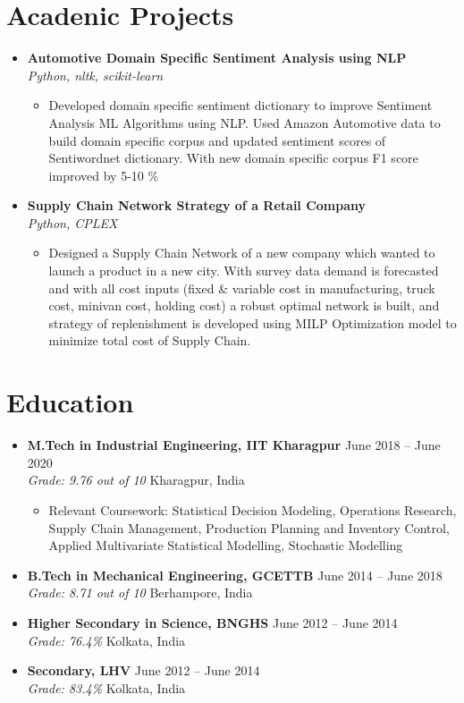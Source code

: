 \documentclass[a4paper,10pt]{article}
\newcommand{\resumeItem}[1]{\item\small{#1}}
\newcommand{\resumeSubheading}[4]{
  \vspace{1pt}\item
    \textbf{#1} \hfill {#2} \\
    \emph{#3} \hfill {#4} \\
}
\begin{document}
\section*{Acadenic Projects}
\begin{itemize}
    \resumeSubheading
      {Automotive Domain Specific Sentiment Analysis using NLP}{}
      {Python, nltk, scikit-learn}{}
      \begin{itemize}
        \resumeItem{
          Developed domain specific sentiment dictionary to improve Sentiment Analysis ML Algorithms using NLP. Used
          Amazon Automotive data to build domain specific corpus and updated sentiment scores of Sentiwordnet
          dictionary. With new domain specific corpus F1 score improved by 5-10 \%
        }
      \end{itemize}

    \resumeSubheading
      {Supply Chain Network Strategy of a Retail Company}{}
      {Python, CPLEX}{}
      \begin{itemize}
      \resumeItem{
        Designed a Supply Chain Network of a new company which wanted to launch a product in a new city. With
        survey data demand is forecasted and with all cost inputs (fixed \& variable cost in manufacturing, truck cost,
        minivan cost, holding cost) a robust optimal network is built, and strategy of replenishment is developed using
        MILP Optimization model to minimize total cost of Supply Chain.
      }
      \end{itemize}

\end{itemize}

\section*{Education}
\begin{itemize}
  \resumeSubheading
    {M.Tech in Industrial Engineering, IIT Kharagpur}{June 2018 -- June 2020}
    {Grade: 9.76 out of 10}{Kharagpur, India}
    \begin{itemize}
      \resumeItem{
        Relevant Coursework: Statistical Decision Modeling, Operations Research, Supply Chain Management, Production Planning and Inventory Control, 
        Applied Multivariate Statistical Modelling, Stochastic Modelling
      }
    \end{itemize}
\end{itemize}
\begin{itemize}
  \resumeSubheading
    {B.Tech in Mechanical Engineering, GCETTB}{June 2014 -- June 2018}
    {Grade: 8.71 out of 10}{Berhampore, India}
\end{itemize}
\begin{itemize}
  \resumeSubheading
    {Higher Secondary in Science, BNGHS}{June 2012 -- June 2014}
    {Grade: 76.4\%}{Kolkata, India}
\end{itemize}
\begin{itemize}
  \resumeSubheading
    {Secondary, LHV}{June 2012 -- June 2014}
    {Grade: 83.4\%}{Kolkata, India}
\end{itemize}
\end{document}
